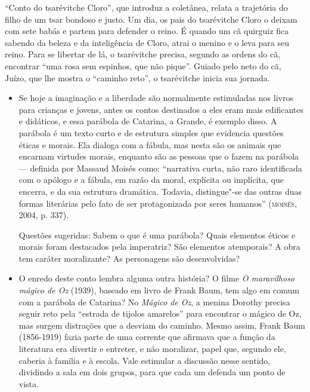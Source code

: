 \documentclass[11pt]{extarticle}
\begin{document}
``Conto do tsarévitche Cloro'', que introduz a coletânea,
relata a trajetória do filho de um tsar bondoso e justo. Um dia, os pais
do tsarévitche Cloro o deixam com sete babás e partem para defender o
reino. É quando um cã quirguiz fica sabendo da beleza e da inteligência
de Cloro, atrai o menino e o leva para seu reino. Para se libertar de
lá, o tsarévitche precisa, segundo as ordens do cã, encontrar ``uma rosa
sem espinhos, que não pique''. Guiado pelo neto do cã, Juízo, que lhe
mostra o ``caminho reto'', o tsarévitche inicia sua jornada.

\begin{itemize}
\item Se hoje a imaginação e a liberdade são normalmente estimuladas nos
livros para crianças e jovens, antes os contos destinados a eles eram
mais edificantes e didáticos, e essa parábola de Catarina, a Grande, é
exemplo disso. A parábola é um texto curto e de estrutura simples que
evidencia questões éticas e morais. Ela dialoga com a fábula, mas nesta
são os animais que encarnam virtudes morais, enquanto são as pessoas que o fazem
na parábola --- definida por Massaud Moisés como: ``narrativa curta, não
raro identificada com o apólogo e a fábula, em razão da moral, explícita
ou implícita, que encerra, e da sua estrutura dramática. Todavia,
distingue"-se das outras duas formas literárias pelo fato de ser
protagonizada por seres humanos'' (\textsc{moisés}, 2004, p. 337).

Questões sugeridas: Sabem o que é uma parábola? Quais elementos éticos e
morais foram destacados pela imperatriz? São elementos atemporais? A
obra tem caráter moralizante? As personagens são desenvolvidas?
\end{itemize}


\begin{itemize}
\item O enredo deste conto lembra alguma outra história? O filme \emph{O
maravilhoso mágico de Oz} (1939), baseado em livro de Frank Baum, tem
algo em comum com a parábola de Catarina? No \emph{Mágico de Oz}, a
menina Dorothy precisa seguir reto pela ``estrada de tijolos amarelos''
para encontrar o mágico de Oz, mas surgem distrações que a desviam do
caminho. Mesmo assim, Frank Baum (1856-1919) fazia parte de uma corrente
que afirmava que a função da literatura era divertir e entreter, e não
moralizar, papel que, segundo ele, caberia à família e à escola. Vale
estimular a discussão nesse sentido, dividindo a sala em dois grupos,
para que cada um defenda um ponto de vista.
\end{itemize}
\end{document}
